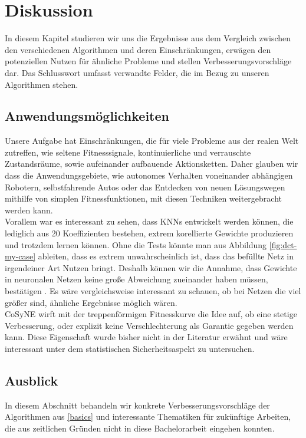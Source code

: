 \chapter{Diskussion}
    In diesem Kapitel studieren wir uns die Ergebnisse aus dem Vergleich zwischen den verschiedenen Algorithmen und deren Einschränkungen, erwägen den potenziellen Nutzen für ähnliche Probleme und stellen Verbesserungsvorschläge dar. Das Schlusswort umfasst verwandte Felder, die im Bezug zu unseren Algorithmen stehen.
    \section{Anwendungsmöglichkeiten}
        Unsere Aufgabe hat Einschränkungen, die für viele Probleme aus der realen Welt zutreffen, wie seltene Fitnesssignale, kontinuierliche und verrauschte Zustandsräume, sowie aufeinander aufbauende Aktionsketten. Daher glauben wir dass die Anwendungsgebiete, wie autonomes Verhalten voneinander abhängigen Robotern, selbstfahrende Autos oder das Entdecken von neuen Lösungswegen mithilfe von simplen Fitnessfunktionen, mit diesen Techniken weitergebracht werden kann. \\

        \noindent
        Vorallem war es interessant zu sehen, dass KNNs entwickelt werden können, die lediglich aus 20 Koeffizienten bestehen, extrem korellierte Gewichte produzieren und trotzdem lernen können. Ohne die Tests könnte man aus Abbildung \ref{fig:dct-my-case} ableiten, dass es extrem unwahrscheinlich ist, dass das befüllte Netz in irgendeiner Art Nutzen bringt. Deshalb können wir die Annahme, dass Gewichte in neuronalen Netzen keine große Abweichung zueinander haben müssen, bestätigen \cite{cosyne1}. Es wäre vergleichsweise interessant zu schauen, ob bei Netzen die viel größer sind, ähnliche Ergebnisse möglich wären. \\

        \noindent
        CoSyNE wirft mit der treppenförmigen Fitnesskurve die Idee auf, ob eine stetige Verbesserung, oder explizit keine Verschlechterung als Garantie gegeben werden kann. Diese Eigenschaft wurde bisher nicht in der Literatur \cite{cosyne1}\cite{cosyne2}\cite{cosyne3} erwähnt und wäre interessant unter dem statistischen Sicherheitsaspekt zu untersuchen.

\newpage

    \section{Ausblick} \label{ausblick}
        In diesem Abschnitt behandeln wir konkrete Verbesserungsvorschläge der Algorithmen aus \ref{basics} und interessante Thematiken für zukünftige Arbeiten, die aus zeitlichen Gründen nicht in diese Bachelorarbeit eingehen konnten.

